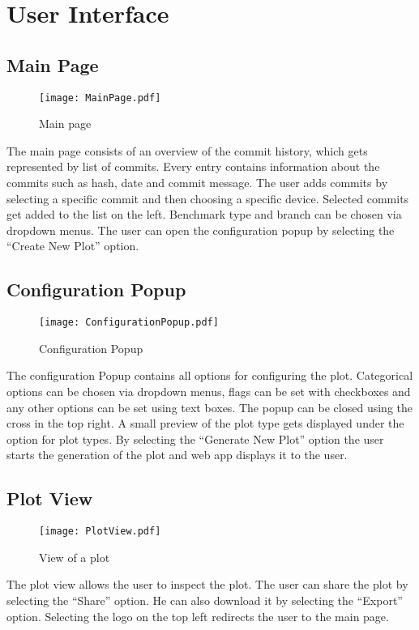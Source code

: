 \section{User Interface}

\subsection{Main Page}

\begin{figure}[H]
    \texttt{[image: MainPage.pdf]}
    \caption{Main page}
    \label{ui:main}
\end{figure}

The main page consists of an overview of the commit history, which gets represented by list of commits. Every entry contains information about the commits such as hash, date and commit message. The user adds commits by selecting a specific commit and then choosing a specific device. Selected commits get added to the list on the left. Benchmark type and branch can be chosen via dropdown menus. The user can open the configuration popup by selecting the \enquote{Create New Plot} option.

\subsection{Configuration Popup}

\begin{figure}[H]
    \texttt{[image: ConfigurationPopup.pdf]}
    \caption{Configuration Popup}
    \label{ui:config}
\end{figure}

The configuration Popup contains all options for configuring the \gls{plot}. Categorical options can be chosen via dropdown menus, flags can be set with checkboxes and any other options can be set using text boxes. The popup can be closed using the cross in the top right. A small preview of the plot type gets displayed under the option for plot types. By selecting the \enquote{Generate New Plot} option the user starts the generation of the \gls{plot} and web app displays it to the user.

\subsection{Plot View}

\begin{figure}[H]
    \texttt{[image: PlotView.pdf]}
    \caption{View of a \gls{plot}}
    \label{ui:plot}
\end{figure}

The plot view allows the user to inspect the \gls{plot}. The user can share the \gls{plot} by selecting the \enquote{Share} option. He can also download it by selecting the \enquote{Export} option. Selecting the logo on the top left redirects the user to the main page.
